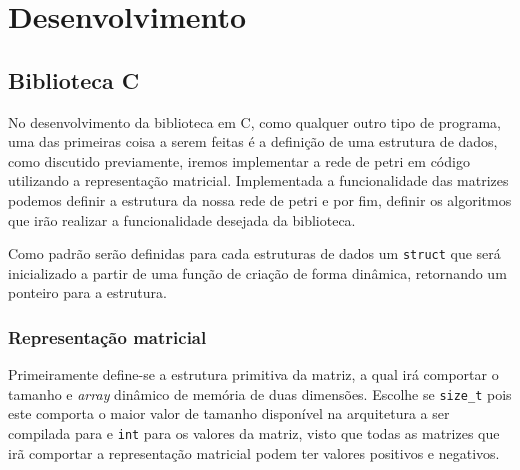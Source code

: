 \chapter{Desenvolvimento}




\section{Biblioteca C}

No desenvolvimento da biblioteca em C, como qualquer outro tipo de programa, uma das primeiras coisa a serem feitas é a definição de uma estrutura de dados, como discutido previamente, iremos implementar a rede de petri em código utilizando a representação matricial. Implementada a funcionalidade das matrizes podemos definir a estrutura da nossa rede de petri e por fim, definir os algoritmos que irão realizar a funcionalidade desejada da biblioteca.

Como padrão serão definidas para cada estruturas de dados um \lstinline{struct} que será inicializado a partir de uma função de criação de forma dinâmica, retornando um ponteiro para a estrutura.

\subsection{Representação matricial}

Primeiramente define-se a estrutura primitiva da matriz, a qual irá comportar o tamanho e \textit{array} dinâmico de memória de duas dimensões. Escolhe se \lstinline{size_t} pois este comporta o maior valor de tamanho disponível na arquitetura a ser compilada para e \lstinline{int} para os valores da matriz, visto que todas as matrizes que irã comportar a representação matricial podem ter valores positivos e negativos.



